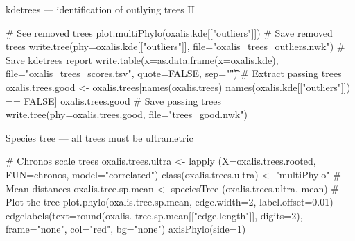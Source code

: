 \documentclass[compress, ucs, xelatex, 11pt, xcolor=svgnames, aspectratio=169,
	hyperref={
		bookmarks=true,
		unicode=true,
		colorlinks=true,
		pdftitle={Molecular data in R},
		plainpages=false,
		pdfauthor={Vojtech Zeisek},
		pdfsubject={Course about phylogeny and evolution in R},
		pdfcreator={XeLaTeX},
		pdfkeywords={R, evolution, phylogeny, molecular data},
		linkcolor=Crimson, %
		anchorcolor=Magenta, %
		citecolor=Magenta, %
		filecolor=Magenta, %
		menucolor=Magenta, %
		urlcolor=DodgerBlue, %
		pdftex},
	url={hyphens, lowtilde} %
	]{beamer}
\renewcommand{\texttt}[1]{\colorbox{Beige}{{\ttfamily #1}}}
\begin{document}
\begin{frame}[fragile]{kdetrees --- identification of outlying trees II}
	\begin{spluscode}
    # See removed trees
    plot.multiPhylo(oxalis.kde[["outliers"]])
    # Save removed trees
    write.tree(phy=oxalis.kde[["outliers"]], file="oxalis_trees_outliers.nwk")
    # Save kdetrees report
    write.table(x=as.data.frame(x=oxalis.kde), file="oxalis_trees_scores.tsv",
      quote=FALSE, sep="\t")
    # Extract passing trees
    oxalis.trees.good <- oxalis.trees[names(oxalis.trees) %
      names(oxalis.kde[["outliers"]]) == FALSE]
    oxalis.trees.good
    # Save passing trees
    write.tree(phy=oxalis.trees.good, file="trees_good.nwk")
	\end{spluscode}
\end{frame}

\begin{frame}[fragile]{Species tree --- all trees must be ultrametric}
	\begin{multicols}{2}
		\begin{center}
			\texttt{[image: oxalis-sp.png]}
		\end{center}
		\begin{spluscode}
    # Chronos scale trees
    oxalis.trees.ultra <- lapply
      (X=oxalis.trees.rooted,
      FUN=chronos, model="correlated")
    class(oxalis.trees.ultra) <-
      "multiPhylo"
    # Mean distances
    oxalis.tree.sp.mean <- speciesTree
      (oxalis.trees.ultra, mean)
    # Plot the tree
    plot.phylo(oxalis.tree.sp.mean,
      edge.width=2, label.offset=0.01)
    edgelabels(text=round(oxalis.
      tree.sp.mean[["edge.length"]],
      digits=2), frame="none",
      col="red", bg="none")
    axisPhylo(side=1)
		\end{spluscode}
	\end{multicols}
	\end{frame}
\end{document}
